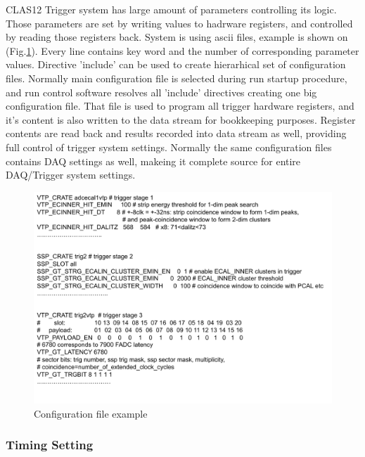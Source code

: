 CLAS12 Trigger system has large amount of parameters controlling its logic. Those parameters are set by writing values to hadrware registers, and controlled by reading those registers back. System is using ascii files, example is shown on (Fig.\ref{fig:config}). Every line contains key word and the number of corresponding parameter values. Directive 'include' can be used to create hierarhical set of configuration files. Normally main configuration file is selected during run startup procedure, and run control software resolves all 'include' directives creating one big configuration file. That file is used to program all trigger hardware registers, and it's content is also written to the data stream for bookkeeping purposes. Register contents are read back and results recorded into data stream as well, providing full control of trigger system settings. Normally the same configuration files contains DAQ settings as well, makeing it complete source for entire DAQ/Trigger system settings.

\begin{figure}[hbt]
	\centering
	\includegraphics[width=1.0\columnwidth,keepaspectratio]{img/config.png}
	\caption{Configuration file example}
	\label{fig:config}
\end{figure}


\subsubsection{Timing Setting}

